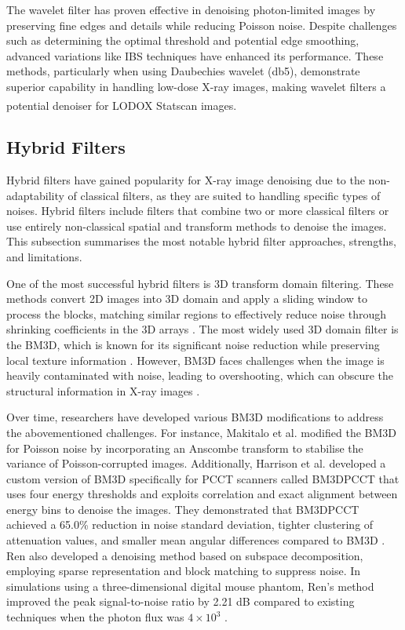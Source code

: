  
The wavelet filter has proven effective in denoising photon-limited images by preserving fine edges and details while reducing Poisson noise. Despite challenges such as determining the optimal threshold and potential edge smoothing, advanced variations like \gls{IBS} techniques have enhanced its performance. These methods, particularly when using Daubechies wavelet (db5), demonstrate superior capability in handling low-dose X-ray images, making wavelet filters a potential denoiser for  LODOX\textsuperscript{\textregistered} Statscan\textsuperscript{\textregistered}  images.

\subsection{Hybrid Filters}
Hybrid filters have gained popularity for X-ray image denoising due to the non-adaptability of classical filters, as they are suited to handling specific types of noises. Hybrid filters include filters that combine two or more classical filters or use entirely non-classical spatial and transform methods to denoise the images. This subsection summarises the most notable hybrid filter approaches, strengths, and limitations.

One of the most successful hybrid filters is 3D transform domain filtering.  These methods convert 2D images into 3D domain and apply a sliding window to process the blocks, matching similar regions to effectively reduce noise through shrinking coefficients in the 3D arrays \cite{rodrigues_denoising_2008}. The most widely used 3D domain filter is the \gls{BM3D}, which is known for its significant noise reduction while preserving local texture information \cite{chandra_analysis_2020}. However, \gls{BM3D} faces challenges when the image is heavily contaminated with noise, leading to overshooting, which can obscure the structural information in X-ray images \cite{chandra_analysis_2020}.

Over time, researchers have developed various \gls{BM3D} modifications to address the abovementioned challenges.  For instance,  Makitalo et al. \cite{6212354} modified the \gls{BM3D} for Poisson noise by incorporating an \gls{Anscombe transform} to stabilise the variance of Poisson-corrupted images. Additionally, Harrison et al. \cite{harrison_multichannel_2017} developed a custom version of \gls{BM3D} specifically for \gls{PCCT} scanners called \gls{BM3D}\textunderscore \gls{PCCT} that uses four energy thresholds and exploits correlation and exact alignment between energy bins to denoise the images.  They demonstrated that \gls{BM3D}\textunderscore \gls{PCCT} achieved a 65.0\% reduction in noise standard deviation, tighter clustering of attenuation values, and smaller mean angular differences compared to \gls{BM3D} \cite{harrison_multichannel_2017}. Ren \cite{ren_simulation_2023} also developed a denoising method based on subspace decomposition, employing sparse representation and block matching to suppress noise. In simulations using a three-dimensional digital mouse phantom, Ren’s method improved the peak signal-to-noise ratio by 2.21 dB compared to existing techniques when the photon flux was  $4 \times 10^3$ \cite{ren_simulation_2023}.

